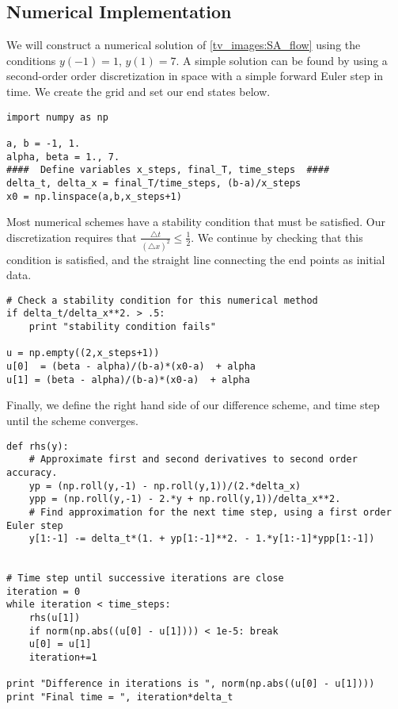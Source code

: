 \subsection*{Numerical Implementation}
We will construct a numerical solution of \eqref{tv_images:SA_flow} using the conditions $y(-1) = 1$, $y(1) = 7$.
A simple solution can be found by using a second-order order discretization in space  with a simple forward Euler step in time. We create the grid and set our end states below.  
\begin{lstlisting}
import numpy as np

a, b = -1, 1.
alpha, beta = 1., 7.
####  Define variables x_steps, final_T, time_steps  ####
delta_t, delta_x = final_T/time_steps, (b-a)/x_steps
x0 = np.linspace(a,b,x_steps+1)
\end{lstlisting}

Most numerical schemes have a stability condition that must be satisfied. Our discretization requires that $\frac{\triangle t}{(\triangle x)^2} \leq \frac{1}{2}$.  
We continue by checking that this condition is satisfied, and the straight line connecting the end points as initial data. 

\begin{lstlisting}
# Check a stability condition for this numerical method
if delta_t/delta_x**2. > .5:
	print "stability condition fails"
	
u = np.empty((2,x_steps+1))
u[0]  = (beta - alpha)/(b-a)*(x0-a)  + alpha
u[1] = (beta - alpha)/(b-a)*(x0-a)  + alpha
\end{lstlisting}

Finally, we define the right hand side of our difference scheme, and time step until the scheme converges. 
\begin{lstlisting}
def rhs(y):
	# Approximate first and second derivatives to second order accuracy.
	yp = (np.roll(y,-1) - np.roll(y,1))/(2.*delta_x)
	ypp = (np.roll(y,-1) - 2.*y + np.roll(y,1))/delta_x**2.
	# Find approximation for the next time step, using a first order Euler step
	y[1:-1] -= delta_t*(1. + yp[1:-1]**2. - 1.*y[1:-1]*ypp[1:-1])


# Time step until successive iterations are close
iteration = 0
while iteration < time_steps:
	rhs(u[1])
	if norm(np.abs((u[0] - u[1]))) < 1e-5: break
	u[0] = u[1]
	iteration+=1

print "Difference in iterations is ", norm(np.abs((u[0] - u[1])))
print "Final time = ", iteration*delta_t
\end{lstlisting}

